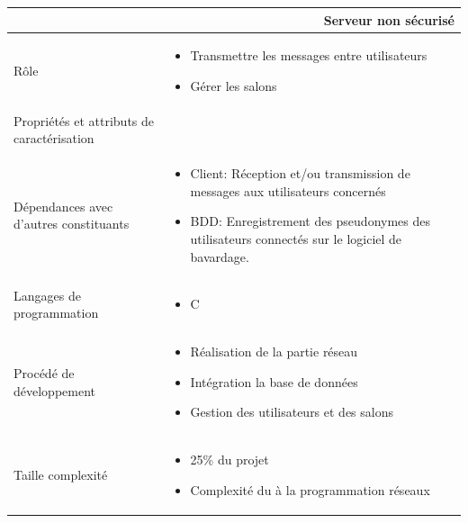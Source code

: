 \documentclass[a4paper,11pt,french]{article}
\begin{document}
\begin{center}
	\vspace*{0.7cm}
	\begin{tabularx}{16cm}{|l|X|}
	\hline
	\multicolumn{2}{|r|}{\textbf{Serveur non sécurisé}}\\
	\hline
	R\^ole &  \begin{itemize}\item Transmettre les messages entre utilisateurs \item Gérer les salons \end{itemize}\\
	\hline
	Propriétés et attributs de caractérisation & \\
	\hline
	Dépendances avec d'autres constituants & \begin{itemize}\item  Client: Réception et/ou transmission de messages aux utilisateurs concernés \item BDD: Enregistrement des pseudonymes des utilisateurs connectés sur le logiciel de bavardage. \end{itemize}\\
	\hline
	Langages de programmation & \begin{itemize} \item C \end{itemize}\\
	\hline
	Procédé de développement & \begin{itemize}\item Réalisation de la partie réseau \item Intégration la base de données \item Gestion des utilisateurs et des salons\end{itemize}\\
	\hline
	Taille complexité & \begin{itemize}\item 25\% du projet \item Complexité du à la programmation réseaux \end{itemize}\\
	\hline
	\end{tabularx}
\end{center}
\end{document}
